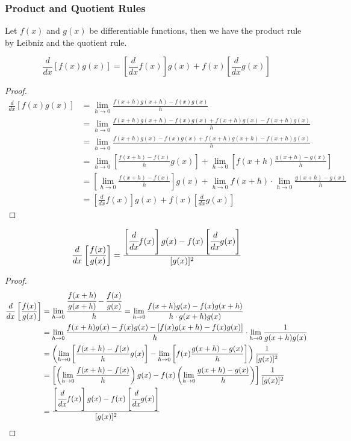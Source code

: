 \subsubsection*{Product and Quotient Rules}
Let \(f(x)\) and \(g(x)\) be differentiable functions, then we have the
product rule by Leibniz and the quotient rule.
\begin{theorem}
    \[\frac{d}{dx}[f(x)g(x)]=\left[\frac{d}{dx}f(x)\right]g(x)
    +f(x)\left[\frac{d}{dx}g(x)\right]\]
\end{theorem}
\begin{proof}
    \begin{align*}
        \frac{d}{dx}[f(x)g(x)]
        &= \lim_{h\to 0}\frac{f(x+h)g(x+h)-f(x)g(x)}{h} \\
        &= \lim_{h\to 0}\frac{f(x+h)g(x+h)-f(x)g(x)+f(x+h)g(x)-f(x+h)g(x)}{h} \\
        &= \lim_{h\to 0}\frac{f(x+h)g(x)-f(x)g(x)+f(x+h)g(x+h)-f(x+h)g(x)}{h} \\
        &= \lim_{h\to 0}\left[\frac{f(x+h)-f(x)}{h}g(x)\right]
        +\lim_{h\to 0}\left[f(x+h)\frac{g(x+h)-g(x)}{h}\right] \\
        &= \left[\lim_{h\to 0}\frac{f(x+h)-f(x)}{h}\right]g(x)
        +\lim_{h\to 0}f(x+h)\cdot\lim_{h\to 0}\frac{g(x+h)-g(x)}{h} \\
        &= \left[\frac{d}{dx}f(x)\right]g(x)
        +f(x)\left[\frac{d}{dx}g(x)\right]
    \end{align*}
\end{proof}
\begin{theorem}
    \[\frac{d}{dx}\left[\frac{f(x)}{g(x)}\right]
    =\frac{\left[\cfrac{d}{dx}f(x)\right]g(x)
    -f(x)\left[\cfrac{d}{dx}g(x)\right]}{[g(x)]^2}\]
\end{theorem}
\begin{proof}
    \begin{align*}
        \frac{d}{dx}\left[\frac{f(x)}{g(x)}\right]
        &= \lim_{h\to 0}\frac{\cfrac{f(x+h)}{g(x+h)}-\cfrac{f(x)}{g(x)}}{h}
        =\lim_{h\to 0}\frac{f(x+h)g(x)-f(x)g(x+h)}{h\cdot g(x+h)g(x)} \\
        &= \lim_{h\to 0}\frac{f(x+h)g(x)-f(x)g(x)-[f(x)g(x+h)-f(x)g(x)]}{h}
        \cdot\lim_{h\to 0}\frac{1}{g(x+h)g(x)} \\
        &= \left(\lim_{h\to 0}\left[\frac{f(x+h)-f(x)}{h}g(x)\right]
        -\lim_{h\to 0}\left[f(x)\frac{g(x+h)-g(x)}{h}\right]\right)
        \frac{1}{[g(x)]^2} \\
        &= \left[\left(\lim_{h\to 0}\frac{f(x+h)-f(x)}{h}\right)g(x)
        -f(x)\left(\lim_{h\to 0}\frac{g(x+h)-g(x)}{h}\right)\right]
        \frac{1}{[g(x)]^2} \\
        &= \frac{\left[\cfrac{d}{dx}f(x)\right]g(x)
        -f(x)\left[\cfrac{d}{dx}g(x)\right]}{[g(x)]^2}
    \end{align*}
\end{proof}

